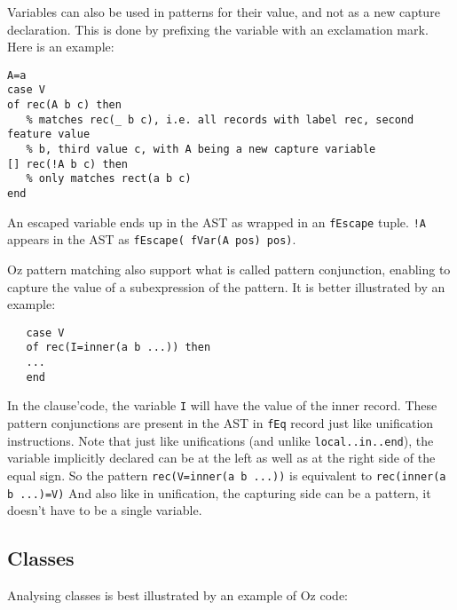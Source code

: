 \documentclass[a4paper]{memoir}
\begin{document}
Variables can also be used in patterns for their value, and not as a new capture
declaration. This is done by prefixing the variable with an exclamation mark.
Here is an example:

\begin{lstlisting}
A=a
case V
of rec(A b c) then
   % matches rec(_ b c), i.e. all records with label rec, second feature value
   % b, third value c, with A being a new capture variable
[] rec(!A b c) then
   % only matches rect(a b c)
end
\end{lstlisting}

An escaped variable ends up in the AST as wrapped in an \lstinline!fEscape!
tuple. \lstinline$!A$ appears in the AST as \lstinline!fEscape( fVar(A pos) pos)!.

Oz pattern matching also support what is called pattern conjunction, enabling to
capture the value of a subexpression of the pattern. It is better
illustrated by an example:
\begin{lstlisting}
   case V 
   of rec(I=inner(a b ...)) then
   ...
   end
\end{lstlisting}

In the clause'code, the variable \lstinline!I! will have the value of the inner record.
These pattern conjunctions are present in the AST in \lstinline!fEq! record just 
like unification instructions.
Note that just like unifications (and unlike \lstinline!local..in..end!), the variable implicitly declared can be at the
left as well as at the right side of the equal sign. So the pattern
\lstinline!rec(V=inner(a b ...))! is equivalent to \lstinline!rec(inner(a b ...)=V)!
And also like in unification, the capturing side can be a pattern, it doesn't
have to be a single variable.


\subsection{Classes}
Analysing classes is best illustrated by an example of Oz code:
\end{document}
